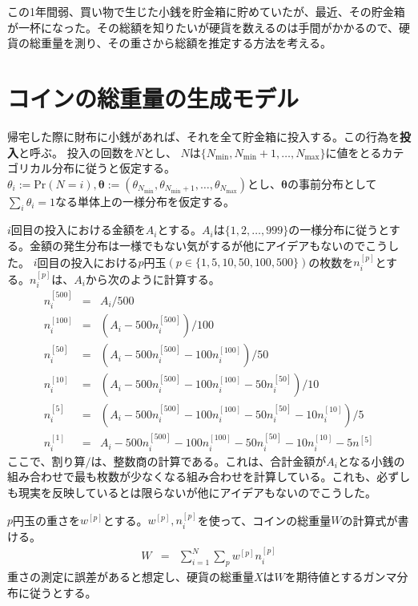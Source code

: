\documentclass{jsarticle}
\newcommand{\numput}{N}
\newcommand{\amount}{A}
\newcommand{\numtoken}[1]{n^{[#1]}}
\newcommand{\ampeq}{&=&}
\newcommand{\weight}[1]{w^{[#1]}}
\newcommand{\totalweight}{W}
\newcommand{\observation}{X}
\newcommand{\prob}{\mathrm{Pr}}
\newcommand{\putmin}{N_{\mathrm{min}}}
\newcommand{\putmax}{N_{\mathrm{max}}}
\begin{document}
この1年間弱、買い物で生じた小銭を貯金箱に貯めていたが、最近、その貯金箱が一杯になった。その総額を知りたいが硬貨を数えるのは手間がかかるので、硬貨の総重量を測り、その重さから総額を推定する方法を考える。

\section{コインの総重量の生成モデル}
帰宅した際に財布に小銭があれば、それを全て貯金箱に投入する。この行為を{\bf 投入}と呼ぶ。
投入の回数を$\numput$とし、
$\numput$は$\{\putmin, \putmin + 1, \ldots, \putmax\}$に値をとるカテゴリカル分布に従うと仮定する。
$\theta_{i} := \prob(\numput=i), \bm{\theta}:=(\theta_{\putmin}, \theta_{\putmin + 1}, \ldots, \theta_{\putmax})$とし、$\bm{\theta}$の事前分布として
$\sum_{i}\theta_{i}=1$なる単体上の一様分布を仮定する。

$i$回目の投入における金額を$\amount_{i}$とする。$\amount_{i}$は$\{1, 2, \ldots, 999\}$の一様分布に従うとする。金額の発生分布は一様でもない気がするが他にアイデアもないのでこうした。
$i$回目の投入における$p$円玉$(p\in \{1, 5, 10, 50, 100, 500\})$の枚数を$\numtoken{p}_{i}$とする。$\numtoken{p}_{i}$は、$\amount_{i}$から次のように計算する。
\begin{eqnarray*}
 \numtoken{500}_{i} \ampeq \amount_{i} / 500 \\
 \numtoken{100}_{i} \ampeq (\amount_{i} - 500\numtoken{500}_{i}) / 100 \\
 \numtoken{50}_{i} \ampeq (\amount_{i} - 500\numtoken{500}_{i} - 100\numtoken{100}_{i}) / 50 \\
 \numtoken{10}_{i} \ampeq (\amount_{i} - 500\numtoken{500}_{i} - 100\numtoken{100}_{i} - 50\numtoken{50}_{i}) / 10 \\
 \numtoken{5}_{i} \ampeq (\amount_{i} - 500\numtoken{500}_{i} - 100\numtoken{100}_{i} - 50\numtoken{50}_{i} - 10\numtoken{10}_{i}) / 5 \\
 \numtoken{1}_{i} \ampeq \amount_{i} - 500\numtoken{500}_{i} - 100\numtoken{100}_{i} - 50\numtoken{50}_{i} - 10\numtoken{10}_{i} - 5\numtoken{5}
\end{eqnarray*}
ここで、割り算$/$は、整数商の計算である。これは、合計金額が$\amount_{i}$となる小銭の組み合わせで最も枚数が少なくなる組み合わせを計算している。これも、必ずしも現実を反映しているとは限らないが他にアイデアもないのでこうした。

$p$円玉の重さを$\weight{p}$とする。$\weight{p}, \numtoken{p}_{i}$を使って、コインの総重量$\totalweight$の計算式が書ける。
\begin{eqnarray*}
 \totalweight \ampeq \sum_{i=1}^{N} \sum_{p} \weight{p} \numtoken{p}_{i}
\end{eqnarray*}
重さの測定に誤差があると想定し、硬貨の総重量$\observation$は$\totalweight$を期待値とするガンマ分布に従うとする。
\end{document}
